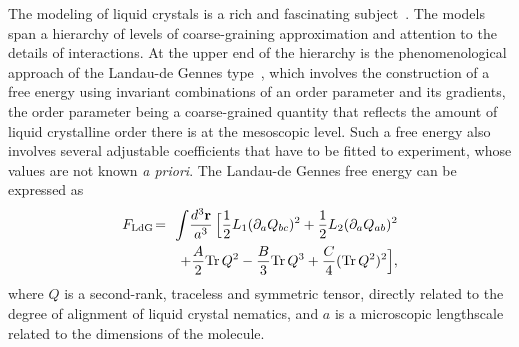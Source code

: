 \documentclass[jcp,aps,twocolumn,showpacs,supergroupedaddress,epsfig,amsmath,amssymb,eqsecnum]{revtex4}
\newcommand{\ba}{\begin{eqnarray}}
\newcommand{\ea}{\end{eqnarray}}
\newcommand{\Tr}{{\rm{Tr}\,}}
\newcommand{\rv}{{\bf r}}
\begin{document}
The modeling of liquid crystals is a rich and fascinating subject~\cite{degennes-prost,chandrasekhar,stephen1974,gramsbergen1986,vertogen-dejeu,ball2010,onsager1949,maier-saupe1958,maier-saupe1959,maier-saupe1960,kobayashi1971,lebwohl-lasher1972,gay-berne1981,berardi1995,berardi1998,mcmillan1971,mcmillan1972,mcmillan1973,chu-mcmillan,ronis1980,cotter1976,petrone1989a,petrone1989b,luo2012,kralj2014,kusumaatmaja2015,svensek2010,svensek2013,dean2012,han2015,pasini2000a,pasini2000b,gelbart-baron1977,cotter1977}. The models span a hierarchy of levels of coarse-graining approximation and attention to the details of interactions. At the upper end of the hierarchy is the phenomenological approach of the Landau-de Gennes type~\cite{degennes-prost,gramsbergen1986,ball2010,luo2012,kralj2014,kusumaatmaja2015}, which involves the construction of a free energy using invariant combinations of an order parameter and its gradients, the order parameter being a coarse-grained quantity that reflects the amount of liquid crystalline order there is at the mesoscopic level. Such a free energy also involves several adjustable coefficients that have to be fitted to experiment, whose values are not known {\it a priori}. The Landau-de Gennes free energy can be expressed as~\cite{gramsbergen1986} 
\ba
F_{{\rm LdG}} &\!=\!& \! \int \! \frac{d^3\rv}{a^3} \, 
\Big[ \frac{1}{2} L_1 (\partial_a Q_{bc})^2 + \frac{1}{2} L_2 (\partial_a Q_{ab})^2
\nonumber\\
&&+ 
\frac{A}{2} \Tr Q^2 
- \frac{B}{3} \Tr Q^3 + \frac{C}{4} (\Tr Q^2)^2
\Big], 
\ea
where $Q$ is a second-rank, traceless and symmetric tensor, directly related to the degree of alignment of liquid crystal nematics, and $a$ is a microscopic lengthscale related to the dimensions of the molecule. 
\end{document}
